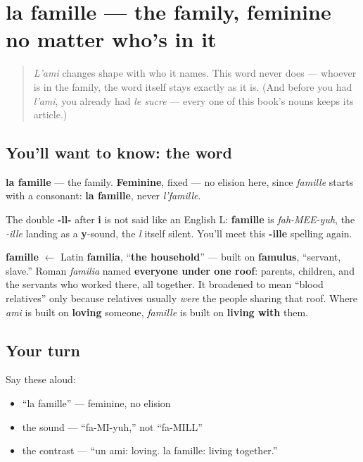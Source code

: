 \section[la famille]{la famille — the family, feminine no matter who's in it}

\label{lesson:FR-C29-famille}



\begin{quote}
\emph{L'ami} changes shape with who it names. This word never does — whoever is in the family, the word itself stays exactly as it is. (And before you had \emph{l'ami}, you already had \emph{le sucre} — every one of this book's nouns keeps its article.)
\end{quote}

\subsection*{You'll want to know: the word}
\textbf{la famille} — the family. \textbf{Feminine}, fixed — no elision here, since \emph{famille} starts with a consonant: \textbf{la famille}, never \emph{l'famille}.

The double \textbf{-ll-} after \textbf{i} is not said like an English L: \textbf{famille} is \emph{fah-MEE-yuh}, the \emph{-ille} landing as a \textbf{y}-sound, the \emph{l} itself silent. You'll meet this \textbf{-ille} spelling again.

\begin{cousinweb}
\textbf{famille} $\leftarrow$ Latin \textbf{familia}, \textquotedblleft{}\textbf{the household}\textquotedblright{} — built on \textbf{famulus}, \textquotedblleft{}servant, slave.\textquotedblright{} Roman \emph{familia} named \textbf{everyone under one roof}: parents, children, and the servants who worked there, all together. It broadened to mean \textquotedblleft{}blood relatives\textquotedblright{} only because relatives usually \emph{were} the people sharing that roof. Where \emph{ami} is built on \textbf{loving} someone, \emph{famille} is built on \textbf{living with} them.
\end{cousinweb}

\subsection*{Your turn}
Say these aloud:

\begin{itemize}
\raggedright
  \item \textquotedblleft{}la famille\textquotedblright{} — feminine, no elision
  \item the sound — \textquotedblleft{}fa-MI-yuh,\textquotedblright{} not \textquotedblleft{}fa-MILL\textquotedblright{}
  \item the contrast — \textquotedblleft{}un ami: loving. la famille: living together.\textquotedblright{}
\end{itemize}

